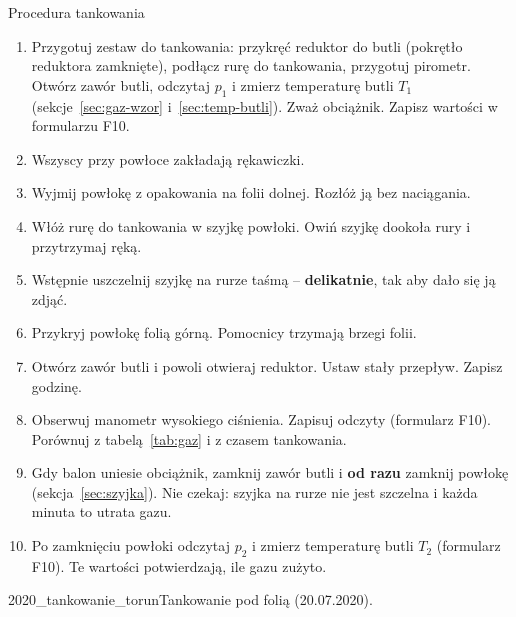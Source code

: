 \begin{sekcja}{Procedura tankowania}
\begin{enumerate}
  \item Przygotuj zestaw do tankowania: przykręć reduktor do butli (pokrętło reduktora zamknięte), podłącz rurę do tankowania, przygotuj pirometr. Otwórz zawór butli, odczytaj $p_1$ i zmierz temperaturę butli $T_1$ (sekcje~\ref{sec:gaz-wzor} i~\ref{sec:temp-butli}). Zważ obciążnik. Zapisz wartości w formularzu F10.
  \item Wszyscy przy powłoce zakładają rękawiczki.
  \item Wyjmij powłokę z opakowania na folii dolnej. Rozłóż ją bez naciągania.
  \item Włóż rurę do tankowania w szyjkę powłoki. Owiń szyjkę dookoła rury i przytrzymaj ręką.
  \item Wstępnie uszczelnij szyjkę na rurze taśmą -- \textbf{delikatnie}, tak aby dało się ją zdjąć.
  \item Przykryj powłokę folią górną. Pomocnicy trzymają brzegi folii.
  \item Otwórz zawór butli i powoli otwieraj reduktor. Ustaw stały przepływ. Zapisz godzinę.
  \item Obserwuj manometr wysokiego ciśnienia. Zapisuj odczyty (formularz F10). Porównuj z tabelą~\ref{tab:gaz} i z czasem tankowania.
  \item Gdy balon uniesie obciążnik, zamknij zawór butli i \textbf{od razu} zamknij powłokę (sekcja~\ref{sec:szyjka}). Nie czekaj: szyjka na rurze nie jest szczelna i każda minuta to utrata gazu.
  \item Po zamknięciu powłoki odczytaj $p_2$ i zmierz temperaturę butli $T_2$ (formularz F10). Te wartości potwierdzają, ile gazu zużyto.
\end{enumerate}

{2020_tankowanie_torun}{Tankowanie pod folią (20.07.2020).}
\end{sekcja}

